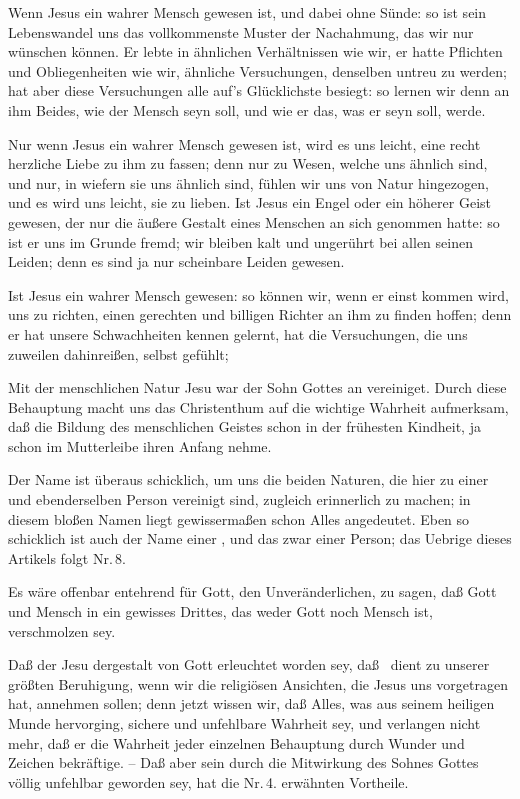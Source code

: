 \begin{aufza}
\begin{aufzb}
\item Wenn Jesus ein wahrer Mensch gewesen ist, und dabei ohne Sünde: so ist sein Lebenswandel uns das voll\-kom\-men\-ste Muster der Nachahmung, das wir nur wünschen können. Er lebte in ähnlichen Verhältnissen wie wir, er hatte Pflichten und Obliegenheiten wie wir, ähnliche Versuchungen, denselben untreu zu werden; hat aber diese Versuchungen alle auf's Glücklichste besiegt: so lernen wir denn an ihm Beides, wie der Mensch seyn soll, und wie er das, was er seyn soll, werde.
\item Nur wenn Jesus ein wahrer Mensch gewesen ist, wird es uns leicht, eine recht herzliche Liebe zu ihm zu fassen; denn nur zu Wesen, welche uns ähnlich sind, und nur, in wiefern sie uns ähnlich sind, fühlen wir uns von Natur hingezogen, und es wird uns leicht, sie zu lieben. Ist Jesus ein Engel oder ein höherer Geist gewesen, der nur die äußere Gestalt eines Menschen an sich genommen hatte: so ist er uns im Grunde fremd; wir bleiben kalt und ungerührt bei allen seinen Leiden; denn es sind ja nur scheinbare Leiden gewesen.
\item Ist Jesus ein wahrer Mensch gewesen: so können wir, wenn er einst kommen wird, uns zu richten, einen gerechten und billigen Richter an ihm zu finden hoffen; denn er hat unsere Schwachheiten kennen gelernt, hat die Versuchungen, die uns zuweilen dahinreißen, selbst gefühlt; \usw\
\end{aufzb}
\item Mit der menschlichen Natur Jesu war der Sohn Gottes  an vereiniget. Durch diese Behauptung macht uns das Christenthum auf die wichtige Wahrheit aufmerksam, daß die Bildung des menschlichen Geistes schon in der frühesten Kindheit, ja schon im Mutterleibe ihren Anfang nehme.
\item Der Name \RWbet{Gottmensch} ist überaus schicklich, um uns die beiden Naturen, die hier zu einer und ebenderselben Person vereinigt sind, zugleich erinnerlich zu machen; in diesem bloßen Namen liegt gewissermaßen schon Alles angedeutet. Eben so schicklich ist auch der Name einer \RWbet{Person}, und das zwar einer  Person; das Uebrige dieses Artikels folgt Nr.\,8.
\item Es wäre offenbar entehrend für Gott, den Unveränderlichen, zu sagen, daß Gott und Mensch in ein gewisses Drittes, das weder Gott noch Mensch ist, verschmolzen sey.~\RWSeitenw{78}
\item Daß der \RWbet{Verstand des Menschen} Jesu dergestalt von Gott erleuchtet worden sey, daß \usw\ dient zu unserer größten Beruhigung, wenn wir die religiösen Ansichten, die Jesus uns vorgetragen hat, annehmen sollen; denn jetzt wissen wir, daß Alles, was aus seinem heiligen Munde hervorging, sichere und unfehlbare Wahrheit sey, und verlangen nicht mehr, daß er die Wahrheit jeder einzelnen Behauptung durch Wunder und Zeichen bekräftige. -- Daß aber sein  durch die Mitwirkung des Sohnes Gottes völlig unfehlbar geworden sey, hat die Nr.\,4. erwähnten Vortheile.

\end{aufza}
